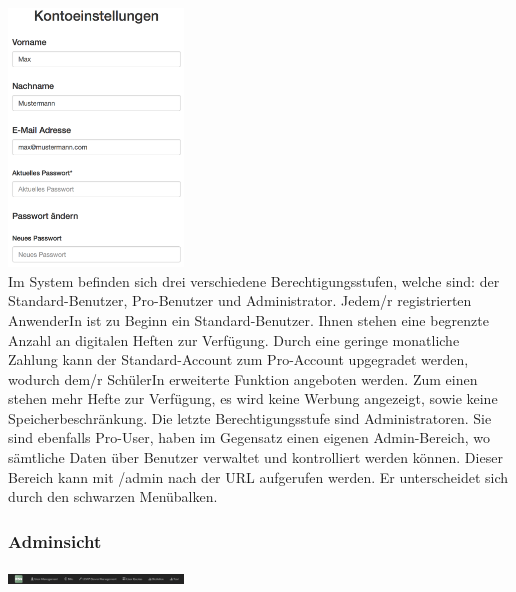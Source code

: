\includegraphics[width=0.35\textwidth]{images/usermanagement/Kontoeinstellungen}\\

Im System befinden sich drei verschiedene Berechtigungsstufen, welche sind: der Standard-Benutzer, Pro-Benutzer und Administrator. Jedem/r registrierten AnwenderIn ist zu Beginn ein Standard-Benutzer. Ihnen stehen eine begrenzte Anzahl an digitalen Heften zur Verfügung. Durch eine geringe monatliche Zahlung kann der Standard-Account zum Pro-Account upgegradet werden, wodurch dem/r SchülerIn erweiterte Funktion angeboten werden. Zum einen stehen mehr Hefte zur Verfügung, es wird keine Werbung angezeigt, sowie keine Speicherbeschränkung. Die letzte Berechtigungsstufe sind Administratoren. Sie sind ebenfalls Pro-User, haben im Gegensatz einen eigenen Admin-Bereich, wo sämtliche Daten über Benutzer verwaltet und kontrolliert werden können. Dieser Bereich kann mit /admin nach der URL aufgerufen werden. Er unterscheidet sich durch den schwarzen Menübalken.

\subsubsection{Adminsicht}

\includegraphics[width=0.35\textwidth]{images/usermanagement/Adminsicht}\\

